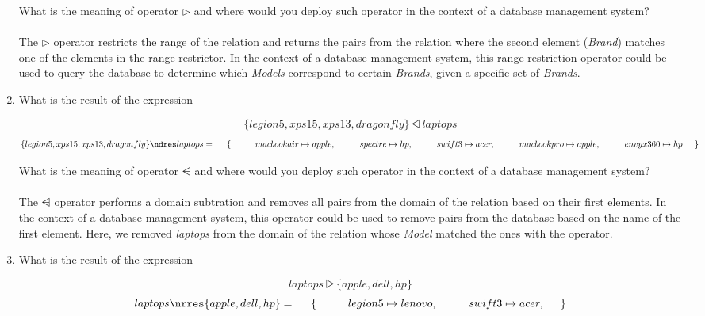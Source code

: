 \documentclass[12pt]{article}
\begin{document}
\begin{enumerate}
\noindent What is the meaning of operator $\rhd$ and where would you deploy such operator in the context of a database management system?\\\\
The $\rhd$ operator restricts the range of the relation and returns the pairs from the relation where the second element (\textit{Brand}) matches one of the elements in the range restrictor. In the context of a database management system, this range restriction operator could be used to query the database to determine which \textit{Models} correspond to certain \textit{Brands}, given a specific set of \textit{Brands}.

\item What is the result of the expression

\[ \{ legion5, xps15, xps13, dragonfly \} \ndres laptops \]
\[ \{ legion5, xps15, xps13, dragonfly \} \ndres laptops =\\
\hspace{5mm} \{ \\
\hspace{10mm} macbookair \mapsto apple,\\
\hspace{10mm} spectre \mapsto hp,\\
\hspace{10mm} swift3 \mapsto acer,\\
\hspace{10mm} macbookpro \mapsto apple,\\
\hspace{10mm} envyx360 \mapsto hp\\
\hspace{5mm} \}
\]

\noindent What is the meaning of operator $\ndres$ and where would you deploy such operator in the context of a database management system?\\\\
The $\ndres$ operator performs a domain subtration and removes all pairs from the domain of the relation based on their first elements. In the context of a database management system, this operator could be used to remove pairs from the database based on the name of the first element. Here, we removed \textit{laptops} from the domain of the relation whose \textit{Model} matched the ones with the operator.

\item What is the result of the expression

\[ laptops \nrres \{ apple, dell, hp \} \]
\[ laptops \nrres \{ apple, dell, hp \} =\\
\hspace{5mm} \{ \\
\hspace{10mm} legion5 \mapsto lenovo,\\
\hspace{10mm} swift3 \mapsto acer,\\
\hspace{5mm} \}
\]


\end{enumerate}
\end{document}
